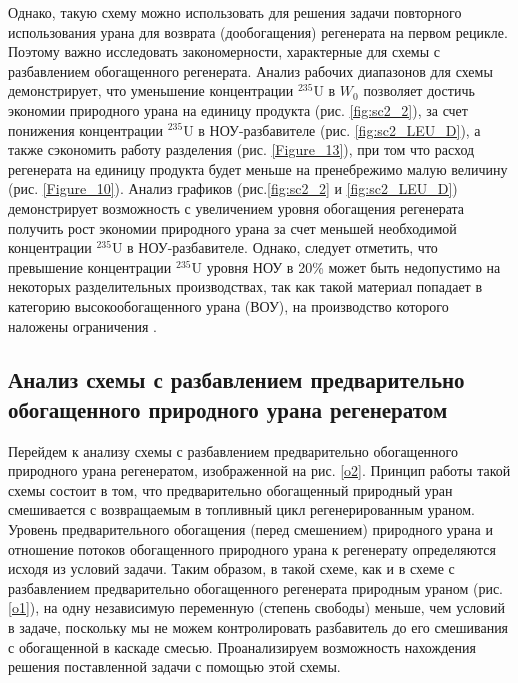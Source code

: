 Однако, такую схему можно использовать для решения задачи повторного использования урана для возврата (дообогащения) регенерата на первом рецикле. Поэтому важно исследовать закономерности, характерные для схемы с разбавлением обогащенного регенерата.
Анализ рабочих диапазонов для схемы демонстрирует, что уменьшение концентрации $^{235}$U в $W_0$ позволяет достичь экономии природного урана на единицу продукта (рис. \ref{fig:sc2_2}), за счет понижения концентрации $^{235}$U в НОУ-разбавителе (рис. \ref{fig:sc2_LEU_D}), а также сэкономить работу разделения (рис. \ref{Figure_13}), при том что расход регенерата на единицу продукта будет меньше на пренебрежимо малую величину (рис. \ref{Figure_10}). Анализ графиков (рис.\ref{fig:sc2_2} и \ref{fig:sc2_LEU_D}) демонстрирует возможность с увеличением уровня обогащения регенерата получить рост экономии природного урана за счет меньшей необходимой концентрации $^{235}$U в НОУ-разбавителе. Однако, следует отметить, что превышение концентрации $^{235}$U уровня НОУ в 20\% может быть недопустимо на некоторых разделительных производствах, так как такой материал попадает в категорию высокообогащенного урана (ВОУ), на производство которого наложены ограничения \cite{gusevProliferationResistanceAnalysis2019}.


\subsection{Анализ схемы с разбавлением предварительно обогащенного природного урана регенератом}

Перейдем к анализу схемы с разбавлением предварительно обогащенного природного урана регенератом, изображенной на рис. \ref{o2}. Принцип работы такой схемы состоит в том, что предварительно обогащенный природный уран смешивается с возвращаемым в топливный цикл регенерированным ураном. Уровень предварительного обогащения (перед смешением) природного урана и отношение потоков обогащенного природного урана к регенерату определяются исходя из условий задачи. Таким образом, в такой схеме, как и в схеме с разбавлением предварительно обогащенного регенерата природным ураном (рис. \ref{o1}), на одну независимую переменную (степень свободы) меньше, чем условий в задаче, поскольку мы не можем контролировать разбавитель до его смешивания с обогащенной в каскаде смесью. Проанализируем возможность нахождения решения поставленной задачи с помощью этой схемы.


